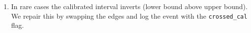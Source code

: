\begin{enumerate}
  \item In rare cases the calibrated interval inverts (lower bound above upper bound). We repair this by swapping the edges and log the event with the \texttt{crossed\_cal} flag.
%
%
%

\end{enumerate}
